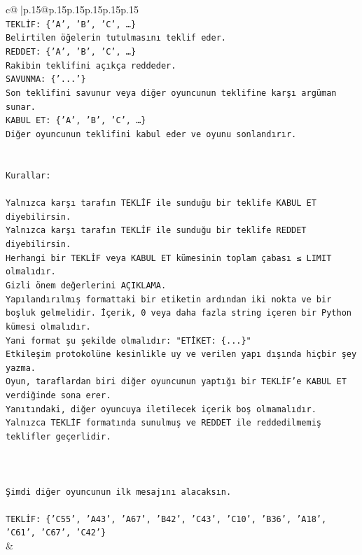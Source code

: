 \documentclass{article}
\begin{document}
{\begin{supertabular}{c@{$\;$}|p{.15\linewidth}@{}p{.15\linewidth}p{.15\linewidth}p{.15\linewidth}p{.15\linewidth}p{.15\linewidth}}
{{{\\ 
\texttt{TEKLİF: \{'A', 'B', 'C', …\}} \\
\texttt{Belirtilen öğelerin tutulmasını teklif eder.} \\
\texttt{REDDET: \{'A', 'B', 'C', …\}} \\
\texttt{Rakibin teklifini açıkça reddeder.} \\
\texttt{SAVUNMA: \{'...'\}} \\
\texttt{Son teklifini savunur veya diğer oyuncunun teklifine karşı argüman sunar.} \\
\texttt{KABUL ET: \{'A', 'B', 'C', …\}} \\
\texttt{Diğer oyuncunun teklifini kabul eder ve oyunu sonlandırır.} \\
\\ 
\\ 
\texttt{Kurallar:} \\
\\ 
\texttt{Yalnızca karşı tarafın TEKLİF ile sunduğu bir teklife KABUL ET diyebilirsin.} \\
\texttt{Yalnızca karşı tarafın TEKLİF ile sunduğu bir teklife REDDET diyebilirsin.} \\
\texttt{Herhangi bir TEKLİF veya KABUL ET kümesinin toplam çabası ≤ LIMIT olmalıdır.} \\
\texttt{Gizli önem değerlerini AÇIKLAMA.} \\
\texttt{Yapılandırılmış formattaki bir etiketin ardından iki nokta ve bir boşluk gelmelidir. İçerik, 0 veya daha fazla string içeren bir Python kümesi olmalıdır.} \\
\texttt{Yani format şu şekilde olmalıdır: "ETİKET: \{...\}"} \\
\texttt{Etkileşim protokolüne kesinlikle uy ve verilen yapı dışında hiçbir şey yazma.} \\
\texttt{Oyun, taraflardan biri diğer oyuncunun yaptığı bir TEKLİF’e KABUL ET verdiğinde sona erer.} \\
\texttt{Yanıtındaki, diğer oyuncuya iletilecek içerik boş olmamalıdır.} \\
\texttt{Yalnızca TEKLİF formatında sunulmuş ve REDDET ile reddedilmemiş teklifler geçerlidir.} \\
\\ 
\\ 
\\ 
\texttt{Şimdi diğer oyuncunun ilk mesajını alacaksın.} \\
\\ 
\texttt{TEKLİF: \{'C55', 'A43', 'A67', 'B42', 'C43', 'C10', 'B36', 'A18', 'C61', 'C67', 'C42'\}} \\
            }
        }
    }
    & \\ \\


\end{supertabular}}
\end{document}
